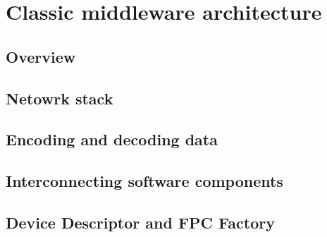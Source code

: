 \chapter{Classic middleware architecture}

\section{Overview}

\section{Netowrk stack}

\section{Encoding and decoding data}

\section{Interconnecting software components}

\section{Device Descriptor and FPC Factory}
